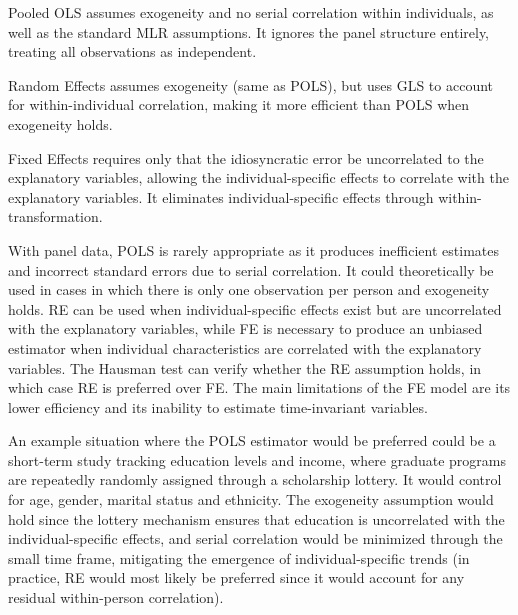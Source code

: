 


Pooled OLS assumes exogeneity and no serial correlation within individuals, as well as the standard MLR assumptions. It ignores the panel structure entirely, treating all observations as independent.

Random Effects assumes exogeneity (same as POLS), but uses GLS to account for within-individual correlation, making it more efficient than POLS when exogeneity holds.

Fixed Effects requires only that the idiosyncratic error be uncorrelated to the explanatory variables, allowing the individual-specific effects to correlate with the explanatory variables. It eliminates individual-specific effects through within-transformation.

With panel data, POLS is rarely appropriate as it produces inefficient estimates and incorrect standard errors due to serial correlation. It could theoretically be used in cases in which there is only one observation per person and exogeneity holds. RE can be used when individual-specific effects exist but are uncorrelated with the explanatory variables, while FE is necessary to produce an unbiased estimator when individual characteristics are correlated with the explanatory variables. The Hausman test can verify whether the RE assumption holds, in which case RE is preferred over FE. The main limitations of the FE model are its lower efficiency and its inability to estimate time-invariant variables.

\newpage


An example situation where the POLS estimator would be preferred could be a short-term study tracking education levels and income, where graduate programs are repeatedly randomly assigned through a scholarship lottery. It would control for age, gender, marital status and ethnicity. The exogeneity assumption would hold since the lottery mechanism ensures that education is uncorrelated with the individual-specific effects, and serial correlation would be minimized through the small time frame, mitigating the emergence of individual-specific trends (in practice, RE would most likely be preferred since it would account for any residual within-person correlation).

